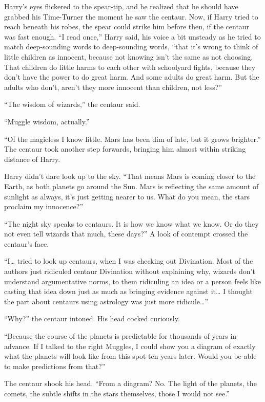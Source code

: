 Harry's eyes flickered to the spear-tip, and he realized that he should
have grabbed his Time-Turner the moment he saw the centaur. Now, if
Harry tried to reach beneath his robes, the spear could strike him
before then, if the centaur was fast enough. ``I read once,'' Harry
said, his voice a bit unsteady as he tried to match deep-sounding words
to deep-sounding words, ``that it's wrong to think of little children as
innocent, because not knowing isn't the same as not choosing. That
children do little harms to each other with schoolyard fights, because
they don't have the power to do great harm. And some adults do great
harm. But the adults who don't, aren't they more innocent than children,
not less?''

``The wisdom of wizards,'' the centaur said.

``Muggle wisdom, actually.''

``Of the magicless I know little. Mars has been dim of late, but it
grows brighter.'' The centaur took another step forwards, bringing him
almost within striking distance of Harry.

Harry didn't dare look up to the sky. ``That means Mars is coming closer
to the Earth, as both planets go around the Sun. Mars is reflecting the
same amount of sunlight as always, it's just getting nearer to us. What
do you mean, the stars proclaim my innocence?''

``The night sky speaks to centaurs. It is how we know what we know. Or
do they not even tell wizards that much, these days?'' A look of
contempt crossed the centaur's face.

``I\ldots{} tried to look up centaurs, when I was checking out
Divination. Most of the authors just ridiculed centaur Divination
without explaining why, wizards don't understand argumentative norms, to
them ridiculing an idea or a person feels like casting that idea down
just as much as bringing evidence against it\ldots{} I thought the part
about centaurs using astrology was just more ridicule\ldots{}''

``Why?'' the centaur intoned. His head cocked curiously.

``Because the course of the planets is predictable for thousands of
years in advance. If I talked to the right Muggles, I could show you a
diagram of exactly what the planets will look like from this spot ten
years later. Would you be able to make predictions from that?''

The centaur shook his head. ``From a diagram? No. The light of the
planets, the comets, the subtle shifts in the stars themselves, those I
would not see.''

